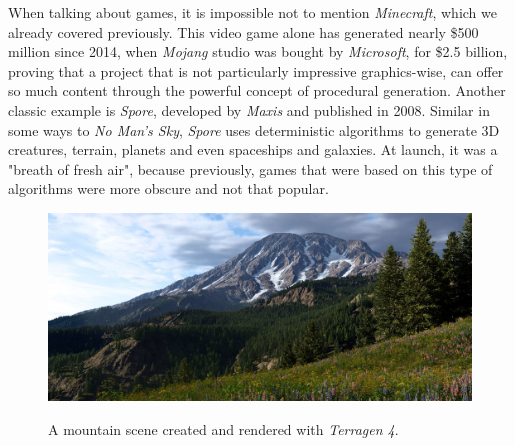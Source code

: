When talking about games, it is impossible not to mention \textit{Minecraft}, which we already covered previously. This video game alone has generated nearly \$500 million since 2014, when \textit{Mojang} studio was bought by \textit{Microsoft}, for \$2.5 billion\cite{minecraftRevenue}, proving that a project that is not particularly impressive graphics-wise, can offer so much content through the powerful concept of procedural generation. Another classic example is \textit{Spore}, developed by \textit{Maxis} and published in 2008. Similar in some ways to \textit{No Man's Sky}, \textit{Spore} uses deterministic algorithms to generate 3D creatures, terrain, planets and even spaceships and galaxies. At launch, it was a "breath of fresh air", because previously, games that were based on this type of algorithms were more obscure and not that popular.

\begin{figure}[htp]
    \centering
    \includegraphics[width = 16cm]{figures/terragen.jpg}
    \caption{A mountain scene created and rendered with \textit{Terragen 4}.}
    \cite{terragen}
    \label{fig:terragen}
\end{figure}